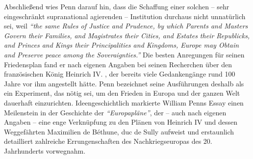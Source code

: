 Abschließend wies Penn darauf hin, dass die Schaffung einer solchen -- sehr
eingeschränkt supranational agierenden -- Institution durchaus nicht unnatürlich
sei, weil \textit{"`the same Rules of Justice and Prudence, by which Parents and
Masters Govern their Families, and Magistrates their Cities, and Estates their
Republicks, and Princes and Kings their Principalities and Kingdoms, Europe may
Obtain and Preserve peace among the Soveraignties."'} Die besten Anregungen für
seinen Friedensplan fand er nach eigenen Angaben bei seinen Recherchen über den
französischen König Heinrich IV. , der bereits
viele Gedankengänge rund 100 Jahre vor ihm angestellt hätte. Penn bezeichnet
seine Ausführungen deshalb als ein Experiment, das nötig sei, um den Frieden in
Europa und der ganzen Welt dauerhaft einzurichten. Ideengeschichtlich markierte
William Penns Essay einen Meilenstein in der Geschichte der
\textit{"`Europapläne"'}, der -- auch nach eigenen Angaben -- eine enge
Verknüpfung zu den Plänen von Heinrich IV  und
dessen Weggefährten Maximilien de Béthune, duc de Sully  aufweist und erstaunlich detailliert zahlreiche
Errungenschaften des Nachkriegseuropas des 20. Jahrhunderts vorwegnahm.


